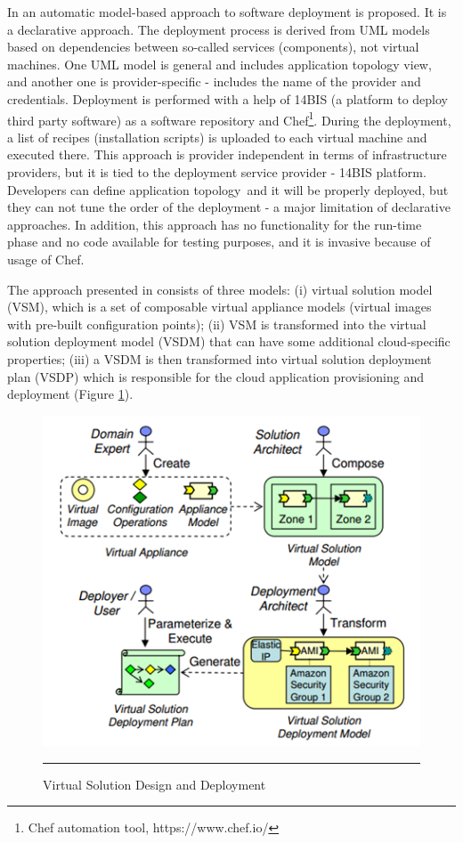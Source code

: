 \noindent In \cite{juniormodel} an automatic model-based approach to software deployment is proposed. It is a declarative approach. The deployment process is derived from UML models based on dependencies between so-called services (components), not virtual machines. One UML model is general and includes application topology view, and another one is provider-specific - includes the name of the provider and credentials. Deployment is performed with a help of 14BIS (a platform to deploy third party software) as a software repository and Chef\footnote{ Chef automation tool, https://www.chef.io/}. During the deployment, a list of recipes (installation scripts) is uploaded to each virtual machine and executed there. This approach is provider independent in terms of infrastructure providers, but it is tied to the deployment service provider - 14BIS platform. Developers can define application topology~and it will be properly deployed, but they can not tune the order of the deployment - a major limitation of declarative approaches. In addition, this approach has no functionality for the run-time phase and no code available for testing purposes, and it is invasive because of usage of Chef.

\noindent 

\noindent The approach presented in\cite{ konstantinou2009architecture} consists of three models: (i) virtual solution model (VSM), which is a set of composable virtual appliance models (virtual images with pre-built configuration points); (ii) VSM is transformed into the virtual solution deployment model (VSDM) that can have some additional cloud-specific properties; (iii) a VSDM is then transformed into virtual solution deployment plan (VSDP) which is responsible for the cloud application provisioning and deployment (Figure \ref{fig:virtual}). 

\begin{figure}[htbp]
	\centering
		\includegraphics{./Figures/Konstantin}
		\rule{38em}{0.5pt}
	\caption[Virtual Solution Approach]{Virtual Solution Design and Deployment}
	\label{fig:virtual}
\end{figure}

